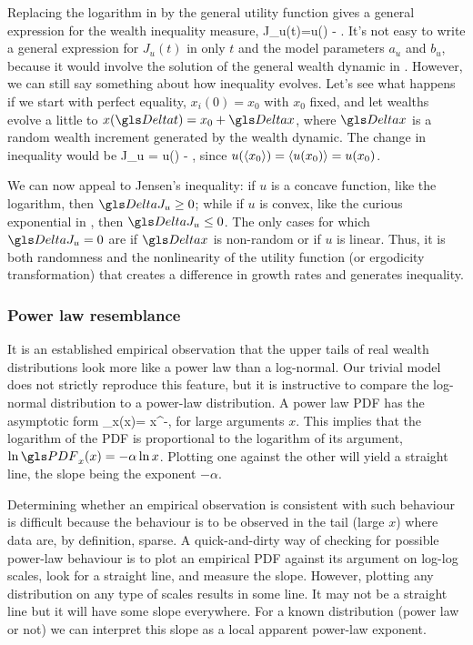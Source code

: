 Replacing the logarithm in  by the general utility function gives a general expression for the wealth inequality measure,
\be
J_u(t)=u() - .
\ee
It's not easy to write a general expression for $J_u(t)$ in only $t$ and the model parameters $a_u$ and $b_u$, because it would involve the solution of the general wealth dynamic in . However, we can still say something about how inequality evolves. Let's see what happens if we start with perfect equality, $x_i(0)=x_0$ with $x_0$ fixed, and let wealths evolve a little to $x(\D t)=x_0+\D x$, where $\D x$ is a random wealth increment generated by the wealth dynamic. The change in inequality would be
\be
\D J_u = u() - ,
\ee
since $u(\left\langle x_0 \right\rangle)=\left\langle u(x_0) \right\rangle=u(x_0)$.

We can now appeal to Jensen's inequality: if $u$ is a concave function, like the logarithm, then $\D J_u \geq 0$; while if $u$ is convex, like the curious exponential in , then $\D J_u \leq 0$. The only cases for which $\D J_u=0$ are if $\D x$ is non-random or if $u$ is linear. Thus, it is both randomness and the nonlinearity of the utility function (or ergodicity transformation) that creates a difference in growth rates and generates inequality.


\subsubsection{Power law resemblance}
It is an established empirical observation \cite{Newman2005} that the upper tails of 
real wealth distributions look more like a power law than a log-normal. Our trivial model does not
strictly reproduce this feature, but it is instructive to compare the log-normal distribution
to a power-law distribution. A power law PDF has the asymptotic form 
\be
\PDF_x(x)= x^{-\alpha},
\ee
for large arguments $x$. This implies that the logarithm of the PDF is proportional 
to the logarithm of its argument, $\ln \PDF_x(x) = -\alpha \ln x$. Plotting
one against the other will yield a straight line, the slope being the exponent $-\alpha$. 

Determining whether an empirical observation is consistent with such behaviour 
is difficult because the behaviour is to be observed in the tail (large $x$) where data are,
by definition, sparse. A quick-and-dirty way of checking for possible power-law 
behaviour is to plot an empirical PDF against its argument on log-log scales, 
look for a straight line, and measure the slope. However, plotting any distribution on any 
type of scales results in some line. It may not be a straight line but it will have some slope 
everywhere. For a known distribution (power law or not) we can interpret this slope 
as a local apparent power-law exponent. 

